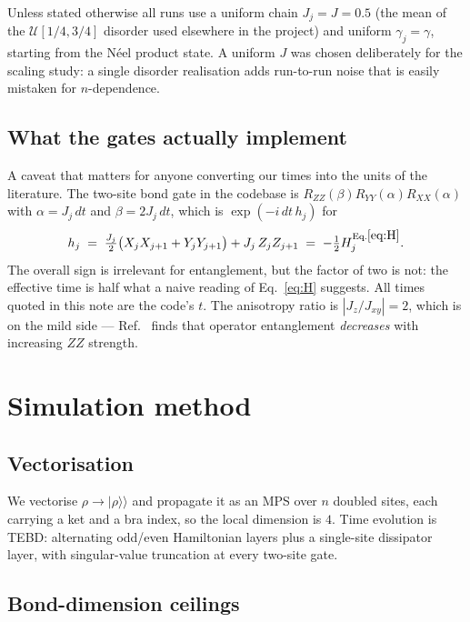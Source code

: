 \documentclass[11pt,a4paper]{article}
\begin{document}
Unless stated otherwise all runs use a uniform chain $J_j=J=0.5$ (the mean of
the $\mathcal{U}[1/4,3/4]$ disorder used elsewhere in the project) and uniform
$\gamma_j=\gamma$, starting from the N\'eel product state. A uniform $J$ was
chosen deliberately for the scaling study: a single disorder realisation adds
run-to-run noise that is easily mistaken for $n$-dependence.

\subsection{What the gates actually implement}
\label{sec:gateconv}

A caveat that matters for anyone converting our times into the units of the
literature. The two-site bond gate in the codebase is
$R_{ZZ}(\beta)R_{YY}(\alpha)R_{XX}(\alpha)$ with $\alpha=J_j\,dt$ and
$\beta=2J_j\,dt$, which is $\exp(-i\,dt\,h_j)$ for
\begin{equation}
  h_j \;=\; \tfrac{J_j}{2}\big(X_jX_{j+1}+Y_jY_{j+1}\big) + J_j\,Z_jZ_{j+1}
  \;=\; -\tfrac12 H_j^{\text{Eq.}\eqref{eq:H}} .
\end{equation}
The overall sign is irrelevant for entanglement, but the factor of two is not:
the effective time is half what a naive reading of Eq.~\eqref{eq:H} suggests.
All times quoted in this note are the code's $t$. The anisotropy ratio is
$|J_z/J_{xy}|=2$, which is on the mild side --- Ref.~\cite{preisser2023comparing}
finds that operator entanglement \emph{decreases} with increasing $ZZ$ strength.

\section{Simulation method}

\subsection{Vectorisation}

We vectorise $\rho\to|\rho\rangle\rangle$ and propagate it as an MPS over $n$
doubled sites, each carrying a ket and a bra index, so the local dimension is
$4$. Time evolution is TEBD: alternating odd/even Hamiltonian layers plus a
single-site dissipator layer, with singular-value truncation at every two-site
gate.

\subsection{Bond-dimension ceilings}
\end{document}
